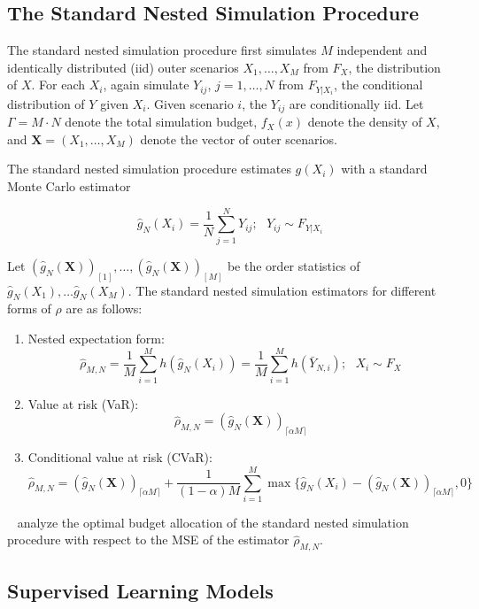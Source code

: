 \subsection{The Standard Nested Simulation Procedure}

The standard nested simulation procedure first simulates $M$ independent and identically distributed (iid) outer scenarios $X_1, \dots, X_M$ from $F_X$, the distribution of $X$.
For each $X_i$, again simulate $Y_{ij}$, $j = 1, \dots, N$ from $F_{Y|X_i}$, the conditional distribution of $Y$ given $X_i$. Given scenario $i$, the $Y_{ij}$ are conditionally iid. Let $\Gamma = M \cdot N$ denote the total simulation budget, $f_X(x)$ denote the density of $X$, and $\mathbf{X} = (X_1, \dots, X_M)$ denote the vector of outer scenarios.

The standard nested simulation procedure estimates $g(X_i)$ with a standard Monte Carlo estimator 

$$\hat{g}_N(X_i) = \frac{1}{N} \sum_{j=1}^N Y_{ij}; ~~~ Y_{ij} \sim F_{Y|X_i} $$

Let $(\hat{g}_N(\mathbf{X}))_{[1]}, \dots, (\hat{g}_N(\mathbf{X}))_{[M]}$ be the order statistics of $\hat{g}_N(X_1), \dots \hat{g}_N(X_M)$. 
The standard nested simulation estimators for different forms of $\rho$ are as follows:

\begin{enumerate}
    \item   Nested expectation form:
            $$\hat{\rho}_{M, N} = \frac{1}{M} \sum_{i=1}^M h(\hat{g}_N(X_i)) = \frac{1}{M} \sum_{i=1}^M h(\bar{Y}_{N, i}); ~~~ X_i \sim F_X$$
    \item   Value at risk (VaR):
            $$\hat{\rho}_{M, N} = (\hat{g}_N(\mathbf{X}))_{\lceil \alpha M \rceil}$$
    \item   Conditional value at risk (CVaR):
            $$\hat{\rho}_{M, N} = (\hat{g}_N(\mathbf{X}))_{\lceil \alpha M \rceil} + \frac{1}{(1-\alpha) M} \sum_{i=1}^M \max \{\hat{g}_N(X_i) - (\hat{g}_N(\mathbf{X}))_{\lceil \alpha M \rceil}, 0 \}$$
\end{enumerate}

~\cite{gordy2010nested} analyze the optimal budget allocation of the standard nested simulation procedure with respect to the MSE of the estimator $\hat{\rho}_{M, N}$.

\subsection{Supervised Learning Models}

